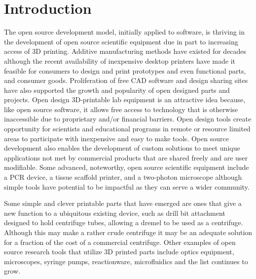 \documentclass{naturegraphicx}
\begin{document}
\section*{Introduction}
The open source development model, initially applied to software, is thriving in the development of open source scientific equipment due in part to increasing access of 3D printing\cite{Baden2015,Pearce2013}.
Additive manufacturing methods have existed for decades although the recent availability of inexpensive desktop printers\cite{MakerbotIndustries,RepRap} have made it feasible for consumers to design and print prototypes and even functional parts, and consumer goods\cite{Fullerton2014,Wittbrodt2013}.
Proliferation of free CAD software\cite{OpenScad,Blender,SketchUp,123D} and design sharing sites\cite{Thingiverse,NationalInstitutesofHealth,GrabCAD,GitHubInc} have also supported the growth and popularity of open designed parts and projects.
Open design 3D-printable lab equipment is an attractive idea because, like open source software, it allows free access to technology that is otherwise inaccessible due to proprietary and/or financial barriers. 
Open design tools create opportunity for scientists and educational programs in remote or resource limited areas to participate with inexpensive and easy to make tools\cite{Marzullo2012,Lang2011,Fobel2013,Baker2014,Cybulski2014,Bhamla2017}.
Open source development also enables the development of custom solutions to meet unique applications not met by commercial products that are shared freely and are user modifiable\cite{Fullerton2014,Pearce2012,Rankin2014,Sulkin2013,Dryden2015,DaCosta2014,Tek2008}.
Some advanced, noteworthy, open source scientific equipment include a PCR device\cite{ChaiBiotechnologiesInc2015}, a tissue scaffold printer\cite{Trachtenberg2014}, and a two-photon microscope\cite{Rosenegger2014} although simple tools have potential to be impactful as they can serve a wider community.

Some simple and clever printable parts that have emerged are ones that give a new function to a ubiquitous existing device, such as drill bit attachment designed to hold centrifuge tubes, allowing a dremel to be used as a centrifuge\cite{Garvey2009}.
Although this may make a rather crude centrifuge it may be an adequate solution for a fraction of the cost of a commercial centrifuge.
Other examples of open source research tools that utilize 3D printed parts include optics equipment\cite{Zhang2013}, microscopes\cite{Baden2014a,Walus2014}, syringe pumps\cite{Wijnen2014,Patrick2015}, reactionware\cite{Symes2012,Kitson2012,Mathieson2013,Kitson2014}, microfluidics\cite{Brennan2015,Dragone2013} and the list continues to grow\cite{PlosCollections}.
\end{document}
